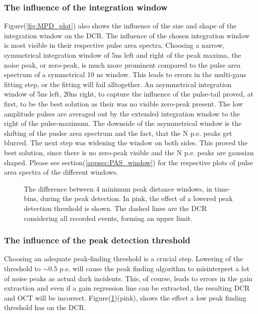 \documentclass[12pt,article,type=msc,colorback,accentcolor=tud9c]{tudthesis}
\begin{document}
\subsubsection{The influence of the integration window}
Figure(\ref{fig:MPD_plot}) also shows the influence of the size and shape of the integration window on the DCR. The influence of the chosen integration window is most visible in their respective pulse area spectra. Choosing a narrow, symmetrical integration window of 5ns left and right of the peak maxima, the noise peak, or zero-peak, is much more prominent compared to the pulse area spectrum of a symmetrical 10 ns window. This leads to errors in the multi-gaus fitting step, or the fitting will fail alltogether. An asymmetrical integration window of 5ns left, 20ns right, to capture the influence of the pulse-tail proved, at first, to be the best solution as their was no visible zero-peak present. The low amplitude pulses are averaged out by the extended integration window to the right of the pulse-maximum. The downside of the asymmetrical window is the shifting of the puslse area spectrum and the fact, that the N p.e. peaks get blurred. The next step was widening the window on both sides. This proved the best solution, since there is no zero-peak visible and the N p.e. peaks are gaussian shaped. Please see section(\ref{appsec:PAS_window})  for the respective plots of pulse area spectra of the different windows.
\begin{figure}[t]
\begin{centering}
\caption[MPD parameter challenges and the threshold]{The difference between 4 minimum peak distance windows, in time-bins, during the peak detection.  In pink, the effect of a lowered peak detection threshold is shown. The dashed lines are the DCR considering all recorded events, forming an upper limit.}
\label{fig:PF_Thresh_plot}
\end{centering}
\end{figure}

\subsubsection{The influence of the peak detection threshold}

Choosing an adequate peak-finding threshold is a crucial step. Lowering of the threshold to $\sim$0.5 p.e. will cause the peak finding algorithm to misinterpret a lot of noise peaks as actual dark incidents. This, of course, leads to errors in the gain extraction and even if a gain regression line can be extracted, the resulting DCR and OCT will be incorrect. Figure(\ref{fig:PF_Thresh_plot})(pink), shows the effect a low peak finding threshold has on the DCR.
\end{document}
